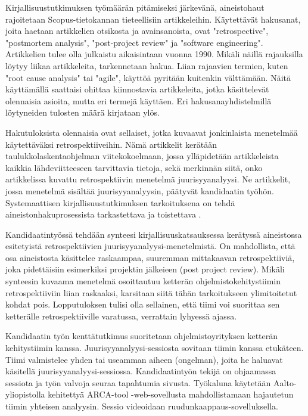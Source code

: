 Kirjallisuustutkimuksen työmäärän pitämiseksi järkevänä, aineistohaut rajoitetaan Scopus-tietokannan tieteellisiin artikkeleihin. Käytettävät hakusanat, joita haetaan artikkelien otsikosta ja avainsanoista, ovat "retrospective", "postmortem analysis", "post-project review" ja "software engineering". Artikkelien tulee olla julkaistu aikaisintaan vuonna 1990. Mikäli näillä rajauksilla löytyy liikaa artikkeleita, tarkennetaan hakua. Liian rajaavien termien, kuten "root cause analysis" tai "agile", käyttöä pyritään kuitenkin välttämään. Näitä käyttämällä saattaisi ohittaa kiinnostavia artikkeleita, jotka käsittelevät olennaisia asioita, mutta eri termejä käyttäen. Eri hakusanayhdistelmillä löytyneiden tulosten määrä kirjataan ylös.

Hakutuloksista olennaisia ovat sellaiset, jotka kuvaavat jonkinlaista menetelmää käytettäväksi retrospektiiveihin. Nämä artikkelit kerätään taulukkolaskentaohjelman viitekokoelmaan, jossa ylläpidetään artikkeleista kaikkia lähdeviitteeseen tarvittavia tietoja, sekä merkinnän siitä, onko artikkelissa kuvattu retrospektiivin menetelmä juurisyyanalyysi. Ne artikkelit, jossa menetelmä sisältää juurisyyanalyysin, päätyvät kandidaatin työhön. Systemaattisen kirjallisuustutkimuksen tarkoituksena on tehdä aineistonhakuprosessista tarkastettava ja toistettava \citep{Kitchenham2007}.

Kandidaatintyössä tehdään synteesi kirjallisuuskatsauksessa kerätyssä aineistossa esitetyistä retrospektiivien juurisyyanalyysi-menetelmistä. On mahdollista, että osa aineistosta käsittelee raskaampaa, suuremman mittakaavan retrospektiiviä, joka pidettäisiin esimerkiksi projektin jälkeieen (post project review). Mikäli synteesin kuvaama menetelmä osoittautuu ketterän ohjelmistokehitystiimin retrospektiiviin liian raskaaksi, karsitaan siitä tähän tarkoitukseen ylimitoitetut kohdat pois. Lopputuloksen tulisi olla sellainen, että tiimi voi suorittaa sen ketterälle retrospektiiville varatussa, verrattain lyhyessä ajassa.

Kandidaatin työn kenttätutkimus suoritetaan ohjelmistoyrityksen ketterän kehitystiimin kanssa. Juurisyyanalyysi-sessiosta sovitaan tiimin kanssa etukäteen. Tiimi valmistelee yhden tai useamman aiheen (ongelman), joita he haluavat käsitellä juurisyyanalyysi-sessiossa. Kandidaatintyön tekijä on ohjaamassa sessiota ja työn valvoja seuraa tapahtumia sivusta. Työkaluna käytetään Aalto-yliopistolla kehitettyä ARCA-tool -web-sovellusta \citep{ArcaTool} mahdollistamaan hajautetun tiimin yhteisen analyysin. Sessio videoidaan ruudunkaappaus-sovelluksella. 

